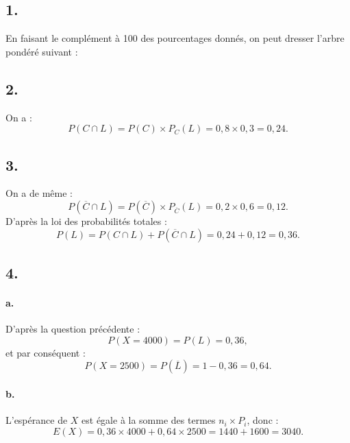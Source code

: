 \subsection*{1.}

En faisant le complément à 100 des pourcentages donnés, on peut dresser l'arbre pondéré suivant :

\begin{center}
\end{center}

\subsection*{2.}

On a :
\[
P(C \cap L) = P(C) \times P_C(L) = 0{,}8 \times 0{,}3 = 0{,}24.
\]

\subsection*{3.}

On a de même :
\[
P(\overline{C} \cap L) = P(\overline{C}) \times P_{\overline{C}}(L) = 0{,}2 \times 0{,}6 = 0{,}12.
\]
D'après la loi des probabilités totales :
\[
P(L) = P(C \cap L) + P(\overline{C} \cap L) = 0{,}24 + 0{,}12 = 0{,}36.
\]

\subsection*{4.}

\paragraph{a.} D'après la question précédente :
\[
P(X = 4000) = P(L) = 0{,}36,
\]
et par conséquent :
\[
P(X = 2500) = P(\overline{L}) = 1 - 0{,}36 = 0{,}64.
\]

\paragraph{b.} L'espérance de \(X\) est égale à la somme des termes \(n_i \times P_i\), donc :
\[
E(X) = 0{,}36 \times 4000 + 0{,}64 \times 2500 = 1440 + 1600 = 3040.
\]

